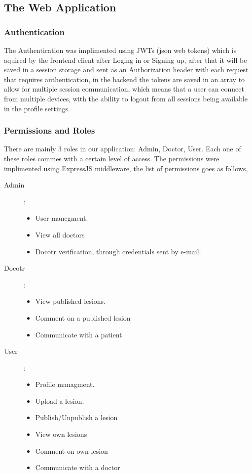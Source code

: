 \subsection{The Web Application}
    \subsubsection{Authentication}
        The Authentication was implimented using JWTs (json web tokens) which is aquired by the frontend client after Loging in or Signing up, after that it will be saved in a session storage and sent as an Authorization header with each request that requires authentication, in the backend the tokens are saved in an array to allow for multiple session communication, which means that a user can connect from multiple devices, with the ability to logout from all sessions being available in the profile settings.
    
    \subsubsection{Permissions and Roles}
        There are mainly 3 roles in our application: Admin, Doctor, User. Each one of these roles commes with a certain level of access. The permissions were implimented using ExpressJS middleware, the list of permissions goes as follows, 

        \begin{description}
            \item[Admin]:\\
            \begin{itemize}
                \item User manegment.
                \item View all doctors
                \item Docotr verification, through credentials sent by e-mail.
            \end{itemize}
            \item[Docotr]:\\
            \begin{itemize}
                \item View published lesions.
                \item Comment on a published lesion
                \item Communicate with a patient
            \end{itemize}
            \item[User]:\\
            \begin{itemize}
                \item Profile managment.
                \item Upload a lesion.
                \item Publish/Unpublish a lesion
                \item View own lesions
                \item Comment  on own lesion
                \item Communicate with a doctor 
            \end{itemize}
        \end{description}
    

